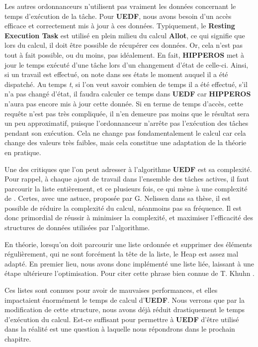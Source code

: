 		Les autres ordonnanceurs n'utilisent pas vraiment les données concernant le temps 
		d'exécution de la tâche. Pour \textbf{UEDF}, nous avons besoin d'un accès efficace et 
		correctement mis à jour à ces données. Typiquement, le \textbf{Resting Execution Task} est utilisé en plein 
		milieu du calcul \textbf{Allot}, ce qui signifie que lors du calcul, il doit être possible 
		de récupérer ces données. Or, cela n'est pas tout à fait possible, ou du moins, pas idéalement. 
		En fait, \textbf{HIPPEROS} met à jour le temps exécuté d'une tâche lors d'un changement d'état de celle-ci. 
		Ainsi, si un travail est effectué, on note dans ses états le moment auquel il a été dispatché.
		Au temps \textit{t}, si l'on veut savoir combien de temps il a été effectué, s'il n'a pas changé 
		d'état, il faudra calculer ce temps dans \textbf{UEDF} car \textbf{HIPPEROS} n'aura pas encore mis à 
		jour cette donnée.\newline
		Si en terme de temps d'accès, cette requête n'est pas très compliquée, il n'en demeure pas moins 
		que le résultat sera un peu approximatif, puisque l'ordonnanceur n'arrête pas l'exécution des tâches pendant 
		son exécution. Cela ne change pas fondamentalement le calcul car cela change des valeurs très faibles, 
		mais cela constitue une adaptation de la théorie en pratique.\newline
		
		
		Une des critiques que l'on peut adresser à l'algorithme \textbf{UEDF} est sa complexité. 
		Pour rappel, à chaque ajout de travail dans l'ensemble des tâches actives, il faut 
		parcourir la liste entièrement, et ce plusieurs fois, ce qui mène à 
		une complexité de . 
		Certes, avec une astuce, proposée par G. Nelissen dans sa thèse, il est possible de réduire 
		la complexité du calcul, néanmoins pas sa fréquence. Il est donc primordial de réussir à 
		minimiser la complexité, et maximiser l'efficacité des structures de données utilisées par l'algorithme.\newline
		
		
		En théorie, lorsqu'on doit parcourir une liste ordonnée et supprimer des éléments régulièrement, 
		qui ne sont forcément la tête de la liste, le Heap est assez mal adapté. En premier lieu, 
		nous avons donc implémenté une liste liée, laissant à une étape ultérieure l'optimisation. 
		Pour citer cette phrase bien connue de T. Khuhn .
		
		Ces listes sont connues pour avoir de mauvaises 
		performances, et elles impactaient énormément le temps de calcul d'\textbf{UEDF}. 
		Nous verrons que par la modification de cette structure, nous avons déjà réduit drastiquement 
		le temps d'exécution du calcul. Est-ce suffisant pour permettre à \textbf{UEDF} d'être utilisé dans la réalité est une question à laquelle nous répondrons dans le prochain chapitre.
		
